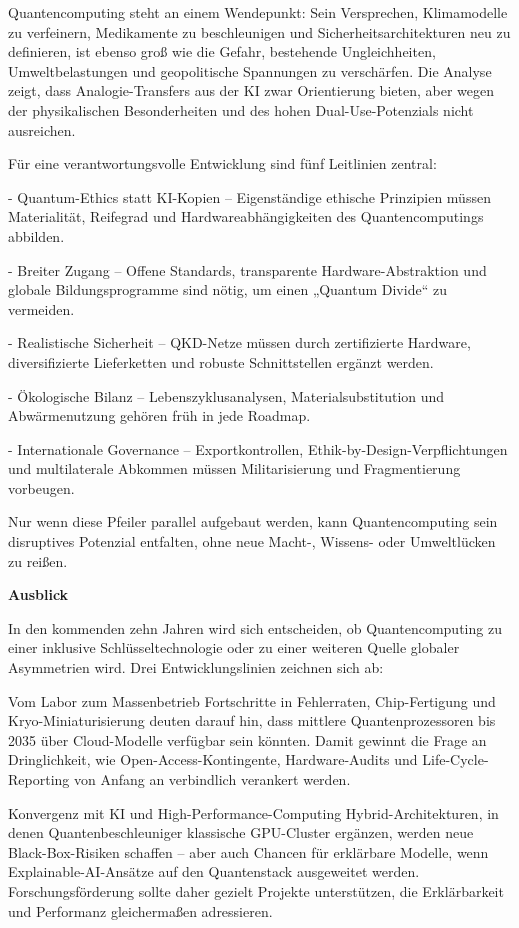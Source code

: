 Quantencomputing steht an einem Wendepunkt: Sein Versprechen, Klimamodelle zu verfeinern, Medikamente zu beschleunigen und Sicherheitsarchitekturen neu zu definieren, ist ebenso groß wie die Gefahr, bestehende Ungleichheiten, Umweltbelastungen und geopolitische Spannungen zu verschärfen. Die Analyse zeigt, dass Analogie-Transfers aus der KI zwar Orientierung bieten, aber wegen der physikalischen Besonderheiten und des hohen Dual-Use-Potenzials nicht ausreichen.


Für eine verantwortungsvolle Entwicklung sind fünf Leitlinien zentral:

- Quantum-Ethics statt KI-Kopien – Eigenständige ethische Prinzipien müssen Materialität, Reifegrad und Hardwareabhängigkeiten des Quantencomputings abbilden.

- Breiter Zugang – Offene Standards, transparente Hardware-Abstraktion und globale Bildungsprogramme sind nötig, um einen „Quantum Divide“ zu vermeiden.

- Realistische Sicherheit – QKD-Netze müssen durch zertifizierte Hardware, diversifizierte Lieferketten und robuste Schnittstellen ergänzt werden.

- Ökologische Bilanz – Lebenszyklusanalysen, Materialsubstitution und Abwärmenutzung gehören früh in jede Roadmap.

- Internationale Governance – Exportkontrollen, Ethik-by-Design-Verpflichtungen und multilaterale Abkommen müssen Militarisierung und Fragmentierung vorbeugen.

Nur wenn diese Pfeiler parallel aufgebaut werden, kann Quantencomputing sein disruptives Potenzial entfalten, ohne neue Macht-, Wissens- oder Umweltlücken zu reißen.


\textbf{Ausblick}

In den kommenden zehn Jahren wird sich entscheiden, ob Quantencomputing zu einer inklusive Schlüsseltechnologie oder zu einer weiteren Quelle globaler Asymmetrien wird. Drei Entwicklungslinien zeichnen sich ab:

Vom Labor zum Massenbetrieb
Fortschritte in Fehlerraten, Chip-Fertigung und Kryo-Miniaturisierung deuten darauf hin, dass mittlere Quantenprozessoren bis 2035 über Cloud-Modelle verfügbar sein könnten. Damit gewinnt die Frage an Dringlichkeit, wie Open-Access-Kontingente, Hardware-Audits und Life-Cycle-Reporting von Anfang an verbindlich verankert werden.

Konvergenz mit KI und High-Performance-Computing
Hybrid-Architekturen, in denen Quantenbeschleuniger klassische GPU-Cluster ergänzen, werden neue Black-Box-Risiken schaffen – aber auch Chancen für erklärbare Modelle, wenn Explainable-AI-Ansätze auf den Quantenstack ausgeweitet werden. Forschungsförderung sollte daher gezielt Projekte unterstützen, die Erklärbarkeit und Performanz gleichermaßen adressieren.

